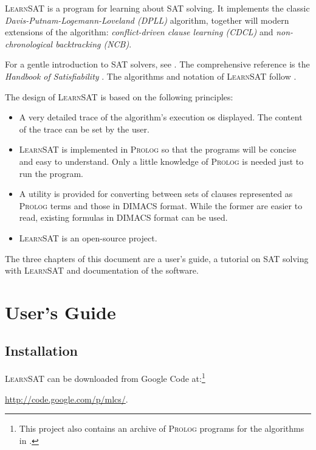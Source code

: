 \documentclass[11pt]{report}
\newcommand*{\ls}{\textsc{LearnSAT}}
\newcommand*{\pl}{\textsc{Prolog}}
\begin{document}
\ls{} is a program for learning about SAT solving. It implements the
classic \emph{Davis-Putnam-Logemann-Loveland (DPLL)} algorithm, together
will modern extensions of the algorithm: \emph{conflict-driven clause
learning (CDCL)} and \emph{non-chronological backtracking (NCB)}.

For a gentle introduction to SAT solvers, see \cite[Chapter~6]{mlcs}.
The comprehensive reference is the \emph{Handbook of Satisfiability}
\cite{SAT}. The algorithms and notation of \ls{} follow \cite{mlm}.

The design of \ls{} is based on the following principles:

\begin{itemize}

\item A very detailed trace of the algorithm's execution os
displayed. The content of the trace can be set by the user.

\item \ls{} is implemented in \pl{} so that the programs will be concise
and easy to understand. Only a little knowledge of \pl{} is needed
just to run the program.

\item A utility is provided for converting between sets of clauses
represented as \pl{} terms and those in DIMACS format. While the former
are easier to read, existing formulas in DIMACS format can be used.

\item \ls{} is an open-source project.
\end{itemize}

The three chapters of this document are a user's guide, a tutorial on
SAT solving with \ls{} and documentation of the software.


\chapter{User's Guide}

\section{Installation}

\ls{} can be downloaded from Google Code at:\footnote{This project also
contains an archive of \pl{} programs for the algorithms in \cite{mlcs}.}
\begin{center}
\url{http://code.google.com/p/mlcs/}.
\end{center}
\end{document}
